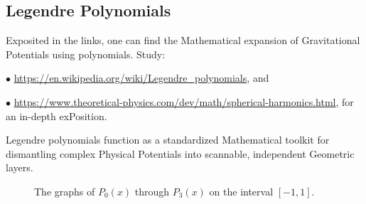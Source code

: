\documentclass[a4paper, 10pt, onepage]{elegantbook}
\begin{document}
{\subsection{Legendre Polynomials}
\label{Legendre Polynomials}
Exposited in the links, one can find the Mathematical expansion of Gravitational Potentials using polynomials. Study:

$\bullet$ \url{https://en.wikipedia.org/wiki/Legendre_polynomials}, and

$\bullet$ \url{https://www.theoretical-physics.com/dev/math/spherical-harmonics.html}, for an in-depth exPosition.  

Legendre polynomials function as a standardized Mathematical toolkit for dismantling complex Physical Potentials into 
scannable, independent Geometric layers.

\begin{figure}[h!]
\centering
{}
\caption{The graphs of $P_0(x)$ through $P_3(x)$ on the interval $[-1, 1]$.}
\end{figure}



















}
\end{document}
